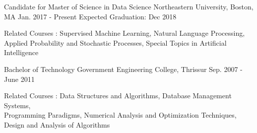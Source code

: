 \vspace{-0.1cm}
\begin{cventries}
  \cventry
    {Candidate for Master of Science in Data Science}
    {Northeastern University, Boston, MA}
    {Jan. 2017 - Present}
    {Expected Graduation: Dec 2018 }
    {
      \begin{cvitems}
      \item {Related Courses : Supervised Machine Learning, Natural Language Processing, \\ Applied Probability and Stochastic Processes, Special Topics in Artificial Intelligence}
      \end{cvitems}
    }
      \cventry
    {Bachelor of Technology}
    {Government Engineering College, Thrissur}
    {Sep. 2007 - June 2011}
    {}
    {
      \begin{cvitems}
      \item {Related Courses : Data Structures and Algorithms, Database Management Systems, \\
          Programming Paradigms, Numerical Analysis and Optimization Techniques, Design and Analysis of Algorithms}
      \end{cvitems}
    }
\end{cventries}

